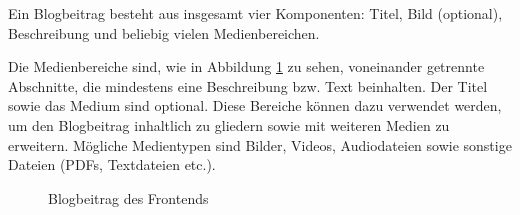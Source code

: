 Ein Blogbeitrag besteht aus insgesamt vier Komponenten: Titel, Bild (optional), Beschreibung und beliebig vielen Medienbereichen.

Die Medienbereiche sind, wie in Abbildung \ref{fig:frontend-blogbeitrag} zu sehen, voneinander getrennte Abschnitte, die mindestens eine Beschreibung bzw. Text beinhalten. Der Titel sowie das Medium sind optional. Diese Bereiche können dazu verwendet werden, um den Blogbeitrag inhaltlich zu gliedern sowie mit weiteren Medien zu erweitern. Mögliche Medientypen sind Bilder, Videos, Audiodateien sowie sonstige Dateien (PDFs, Textdateien etc.).

\begin{figure}[H]
  \setlength{\fboxsep}{0pt}
  \setlength{\fboxrule}{0.5pt}
  \centering
  \caption[Blogbeitrag des Frontends]{Blogbeitrag des Frontends}
  \label{fig:frontend-blogbeitrag}
\end{figure}

